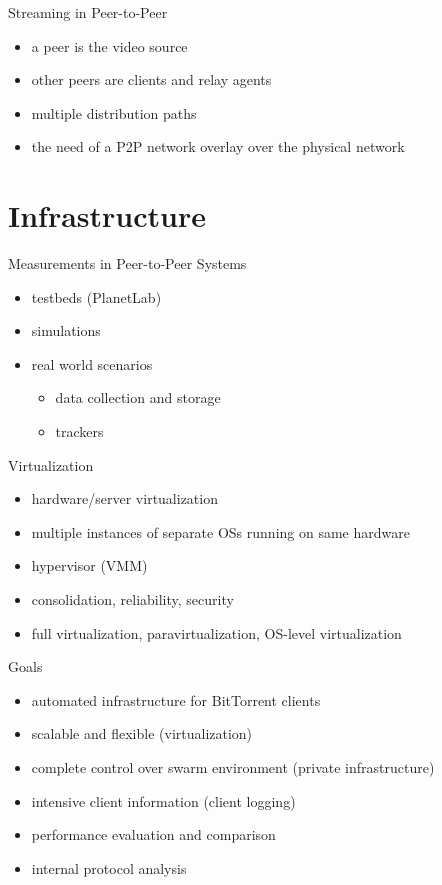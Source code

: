 \documentclass{beamer}
\begin{document}
\begin{frame}{Streaming in Peer-to-Peer}
  \begin{itemize}
    \item a peer is the video source
    \item other peers are clients and relay agents
    \item multiple distribution paths
    \item the need of a P2P network overlay over the physical network
  \end{itemize}
\end{frame}

\section{Infrastructure}

\begin{frame}{Measurements in Peer-to-Peer Systems}
  \begin{itemize}
    \item testbeds (PlanetLab)
    \item simulations
    \item real world scenarios
      \begin{itemize}
        \item data collection and storage
        \item trackers
      \end{itemize}
  \end{itemize}
\end{frame}

\begin{frame}{Virtualization}
  \begin{itemize}
    \item hardware/server virtualization
    \item multiple instances of separate OSs running on same hardware
    \item hypervisor (VMM)
    \item consolidation, reliability, security
    \item full virtualization, paravirtualization, OS-level virtualization
  \end{itemize}
\end{frame}

\begin{frame}{Goals}
  \begin{itemize}
    \item automated infrastructure for BitTorrent clients
    \item scalable and flexible (virtualization)
    \item complete control over swarm environment (private infrastructure)
    \item intensive client information (client logging)
    \item performance evaluation and comparison
    \item internal protocol analysis
  \end{itemize}
\end{frame}
\end{document}
